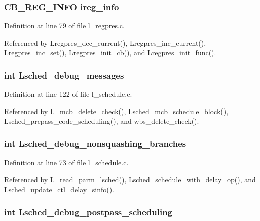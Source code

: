 \subsubsection{\setlength{\rightskip}{0pt plus 5cm}\bf{CB\_\-REG\_\-INFO} \bf{ireg\_\-info}}\label{l__schedule_8h_abc4d42199592ce82fbf255e14709f17}




Definition at line 79 of file l\_\-regpres.c.

Referenced by Lregpres\_\-dec\_\-current(), Lregpres\_\-inc\_\-current(), Lregpres\_\-inc\_\-set(), Lregpres\_\-init\_\-cb(), and Lregpres\_\-init\_\-func().
\subsubsection{\setlength{\rightskip}{0pt plus 5cm}int \bf{Lsched\_\-debug\_\-messages}}\label{l__schedule_8h_69b188aa5e7ffe9ebe9d25ada889bb4f}




Definition at line 122 of file l\_\-schedule.c.

Referenced by L\_\-mcb\_\-delete\_\-check(), Lsched\_\-mcb\_\-schedule\_\-block(), Lsched\_\-prepass\_\-code\_\-scheduling(), and wbs\_\-delete\_\-check().
\subsubsection{\setlength{\rightskip}{0pt plus 5cm}int \bf{Lsched\_\-debug\_\-nonsquashing\_\-branches}}\label{l__schedule_8h_9ee6e81eaa3a35d7523b7d81f38cdbc8}




Definition at line 73 of file l\_\-schedule.c.

Referenced by L\_\-read\_\-parm\_\-lsched(), Lsched\_\-schedule\_\-with\_\-delay\_\-op(), and Lsched\_\-update\_\-ctl\_\-delay\_\-sinfo().
\subsubsection{\setlength{\rightskip}{0pt plus 5cm}int \bf{Lsched\_\-debug\_\-postpass\_\-scheduling}}\label{l__schedule_8h_cb6bd68cf55e01ed524d25aec561a569}




